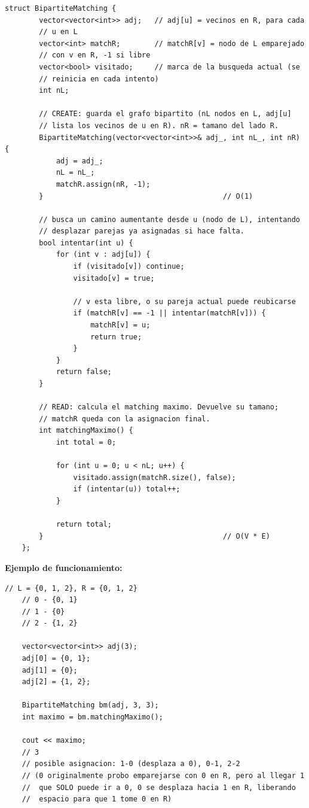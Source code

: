 \documentclass[10pt,a4paper,twocolumn]{article}
\begin{document}
\begin{lstlisting}[style=cpp]
	struct BipartiteMatching {
		vector<vector<int>> adj;   // adj[u] = vecinos en R, para cada
		// u en L
		vector<int> matchR;        // matchR[v] = nodo de L emparejado
		// con v en R, -1 si libre
		vector<bool> visitado;     // marca de la busqueda actual (se
		// reinicia en cada intento)
		int nL;
		
		// CREATE: guarda el grafo bipartito (nL nodos en L, adj[u]
		// lista los vecinos de u en R). nR = tamano del lado R.
		BipartiteMatching(vector<vector<int>>& adj_, int nL_, int nR) {
			adj = adj_;
			nL = nL_;
			matchR.assign(nR, -1);
		}                                          // O(1)
		
		// busca un camino aumentante desde u (nodo de L), intentando
		// desplazar parejas ya asignadas si hace falta.
		bool intentar(int u) {
			for (int v : adj[u]) {
				if (visitado[v]) continue;
				visitado[v] = true;
				
				// v esta libre, o su pareja actual puede reubicarse
				if (matchR[v] == -1 || intentar(matchR[v])) {
					matchR[v] = u;
					return true;
				}
			}
			return false;
		}
		
		// READ: calcula el matching maximo. Devuelve su tamano;
		// matchR queda con la asignacion final.
		int matchingMaximo() {
			int total = 0;
			
			for (int u = 0; u < nL; u++) {
				visitado.assign(matchR.size(), false);
				if (intentar(u)) total++;
			}
			
			return total;
		}                                          // O(V * E)
	};
\end{lstlisting}

\textbf{Ejemplo de funcionamiento:}

\begin{lstlisting}[style=cpp]
	// L = {0, 1, 2}, R = {0, 1, 2}
	// 0 - {0, 1}
	// 1 - {0}
	// 2 - {1, 2}
	
	vector<vector<int>> adj(3);
	adj[0] = {0, 1};
	adj[1] = {0};
	adj[2] = {1, 2};
	
	BipartiteMatching bm(adj, 3, 3);
	int maximo = bm.matchingMaximo();
	
	cout << maximo;
	// 3
	// posible asignacion: 1-0 (desplaza a 0), 0-1, 2-2
	// (0 originalmente probo emparejarse con 0 en R, pero al llegar 1
	//  que SOLO puede ir a 0, 0 se desplaza hacia 1 en R, liberando
	//  espacio para que 1 tome 0 en R)
\end{lstlisting}
\end{document}
